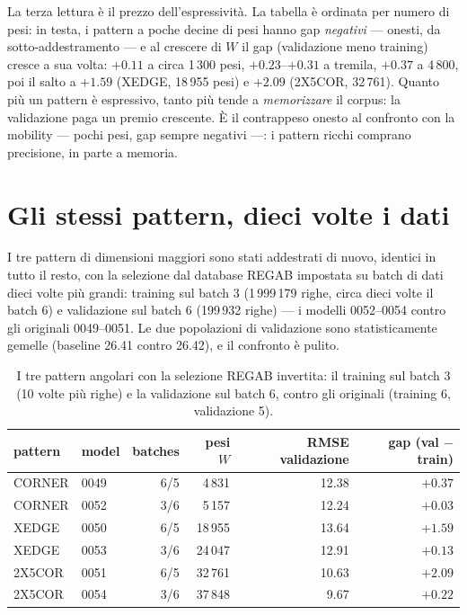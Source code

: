 La terza lettura è il prezzo dell'espressività. La tabella è ordinata
per numero di pesi: in testa, i pattern a poche decine di pesi hanno
gap \emph{negativi} — onesti, da sotto-addestramento — e al crescere
di $W$ il gap (validazione meno training) cresce a sua volta: $+0.11$
a circa 1\,300 pesi, $+0.23$--$+0.31$ a tremila, $+0.37$ a
4\,800, poi il salto a $+1.59$ (XEDGE, 18\,955 pesi) e $+2.09$
(2X5COR, 32\,761). Quanto più un pattern è espressivo, tanto più
tende a \emph{memorizzare} il corpus: la validazione paga un premio
crescente. È il contrappeso onesto al confronto con la mobility —
pochi pesi, gap sempre negativi —: i pattern ricchi comprano
precisione, in parte a memoria.

\section{Gli stessi pattern, dieci volte i dati}

I tre pattern di dimensioni maggiori sono stati addestrati di nuovo,
identici in tutto il resto, con la selezione dal database REGAB
impostata su batch di dati dieci volte più grandi: training sul
batch 3 (1\,999\,179 righe, circa dieci volte il batch 6) e
validazione sul batch 6 (199\,932 righe) — i modelli 0052--0054
contro gli originali 0049--0051. Le due popolazioni di validazione
sono statisticamente gemelle (baseline 26.41 contro 26.42), e il
confronto è pulito.

\begin{table}[ht]
\centering
\begin{tabular}{llrrrr}
\toprule
pattern & model & batches & pesi $W$ & RMSE validazione & gap (val $-$ train) \\
\midrule
CORNER & 0049 & 6/5 & 4\,831  & 12.38 & $+0.37$ \\
CORNER & 0052 & 3/6 & 5\,157  & 12.24 & $+0.03$ \\
XEDGE  & 0050 & 6/5 & 18\,955 & 13.64 & $+1.59$ \\
XEDGE  & 0053 & 3/6 & 24\,047 & 12.91 & $+0.13$ \\
2X5COR & 0051 & 6/5 & 32\,761 & 10.63 & $+2.09$ \\
2X5COR & 0054 & 3/6 & 37\,848 & 9.67  & $+0.22$ \\
\bottomrule
\end{tabular}
\caption{I tre pattern angolari con la selezione REGAB invertita: il
training sul batch 3 (10 volte più righe) e la validazione sul batch
6, contro gli originali (training 6, validazione 5).}
\label{tab:feature-base-pattern-dato}
\end{table}

